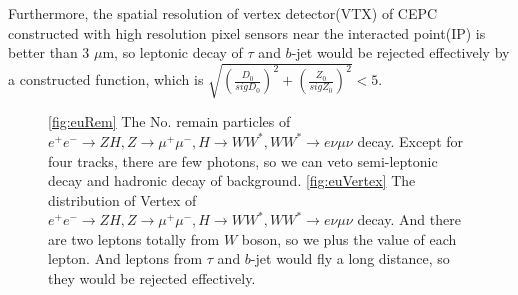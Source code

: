 \documentclass[11pt,a4paper]{cepcnote}
\begin{document}
Furthermore, the spatial resolution of vertex detector(VTX) of CEPC 
constructed with high resolution pixel sensors near the interacted point(IP) is better than 3 $\mu$m,
so leptonic decay of $\tau$  and $b\text{-}$jet would be rejected effectively by a constructed function, which is 
$\sqrt{(\frac{D_{0}}{sigD_{0}})^2+(\frac{Z_{0}}{sigZ_{0}})^2} < 5$. 
\begin{figure}[H]
\centering
\caption[]{\ref{fig:euRem} The No. remain particles of $e^+e^-\rightarrow ZH, Z\rightarrow\mu^+\mu^-, H\rightarrow WW^*,  
	WW^*\rightarrow e\nu\mu\nu$ decay. Except for four tracks, there are few photons, so we can veto semi-leptonic decay
	and hadronic decay of background.
	\ref{fig:euVertex} The distribution of Vertex of $e^+e^-\rightarrow ZH, Z\rightarrow\mu^+\mu^-, H\rightarrow WW^*, 
	WW^*\rightarrow e\nu\mu\nu$ decay. And there are two leptons totally from $W$ boson, so we plus the value of each lepton.
	And leptons from $\tau$ and $b$-jet would fly a long distance, so they would be rejected effectively.}
\label{fig:euRemandVertex}
\end{figure}
\end{document}
